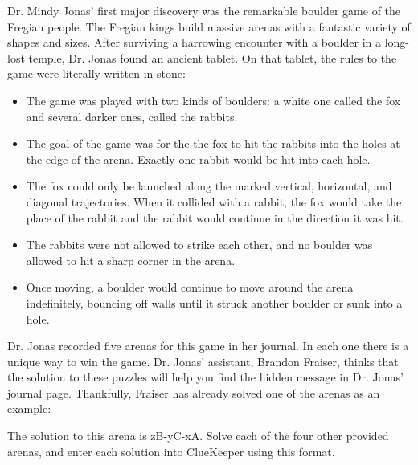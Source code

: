 Dr. Mindy Jonas' first major discovery was the remarkable boulder game of the Fregian people. The Fregian kings build massive arenas with a fantastic variety of shapes and sizes. After surviving a harrowing encounter with a boulder in a long-lost temple, Dr. Jonas found an ancient tablet. On that tablet, the rules to the game were literally written in stone:
\begin{itemize}
        \item The game was played with two kinds of boulders: a white one called the fox and several darker ones, called the rabbits.
        \item The goal of the game was for the the fox to hit the rabbits into the holes at the edge of the arena. Exactly one rabbit would be hit into each hole.
        \item The fox could only be launched along the marked vertical, horizontal, and diagonal trajectories. When it collided with a rabbit, the fox would take the place of the rabbit and the rabbit would continue in the direction it was hit.
        \item The rabbits were not allowed to strike each other, and no boulder was allowed to hit a sharp corner in the arena.
        \item Once moving, a boulder would continue to move around the arena indefinitely, bouncing off walls until it struck another boulder or sunk into a hole.
\end{itemize}

Dr. Jonas recorded five arenas for this game in her journal. In each one there is a unique way to win the game. Dr. Jonas' assistant, Brandon Fraiser, thinks that the solution to these puzzles will help you find the hidden message in Dr. Jonas' journal page. Thankfully, Fraiser has already solved one of the arenas as an example:



The solution to this arena is zB-yC-xA. Solve each of the four other provided arenas, and enter each solution into ClueKeeper using this format.
